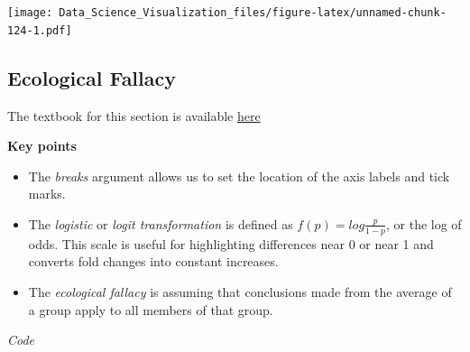 \documentclass[
]{article}
\providecommand{\tightlist}{%
  \setlength{\itemsep}{0pt}\setlength{\parskip}{0pt}}
\begin{document}
\texttt{[image: Data\_Science\_Visualization\_files/figure-latex/unnamed-chunk-124-1.pdf]}

\hypertarget{ecological-fallacy}{%
\subsection{Ecological Fallacy}\label{ecological-fallacy}}

The textbook for this section is available
\href{https://rafalab.github.io/dsbook/gapminder.html\#the-ecological-fallacy-and-importance-of-showing-the-data}{here}

\textbf{Key points}

\begin{itemize}
\tightlist
\item
  The \emph{breaks} argument allows us to set the location of the axis
  labels and tick marks.
\item
  The \emph{logistic} or \emph{logit transformation} is defined as
  \(f(p) = log \frac{p}{1-p}\), or the log of odds. This scale is useful
  for highlighting differences near 0 or near 1 and converts fold
  changes into constant increases.
\item
  The \emph{ecological fallacy} is assuming that conclusions made from
  the average of a group apply to all members of that group.
\end{itemize}

\emph{Code}
\end{document}
